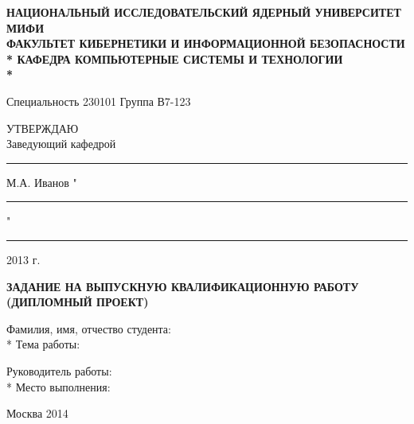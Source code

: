 \begin{titlepage}
\newpage

\begin{center}
\bfseries НАЦИОНАЛЬНЫЙ ИССЛЕДОВАТЕЛЬСКИЙ ЯДЕРНЫЙ УНИВЕРСИТЕТ \guillemotleft МИФИ\guillemotright \\
\vspace{0.7cm}
\bfseries ФАКУЛЬТЕТ КИБЕРНЕТИКИ И ИНФОРМАЦИОННОЙ БЕЗОПАСНОСТИ \\*
КАФЕДРА \guillemotleft КОМПЬЮТЕРНЫЕ СИСТЕМЫ И ТЕХНОЛОГИИ\guillemotright \\*
\end{center}
 
Специальность 230101 \hfill Группа В7-123

\vspace{2em}

\hfill\begin{minipage}[t]{6cm}
\begin{center} 
	\guillemotleft \uppercase{Утверждаю}\guillemotright \\
	Заведующий кафедрой
\end{center}
\begin{flushleft}
\rule{3cm}{0.4pt} М.А. Иванов
"\rule{.5cm}{0.4pt}" \rule{3cm}{0.4pt} 2013 г.
\end{flushleft}
\end{minipage}


\vspace{8em}

\begin{center}
\large\bfseries ЗАДАНИЕ НА ВЫПУСКНУЮ КВАЛИФИКАЦИОННУЮ РАБОТУ \\ (ДИПЛОМНЫЙ ПРОЕКТ)
\end{center}

\vspace{3em}
 
\begin{flushleft}
Фамилия, имя, отчество студента: \textbf{\username} \\*
Тема работы: \begin{minipage}[t]{0.75\textwidth} {\textbf{\thesisTheme}} \end{minipage}
\end{flushleft}
Руководитель работы: \textbf{\projectManager} \\*
Место выполнения: \textbf{\workplace}

\vspace{\fill}

\begin{center}
Москва 2014
\end{center}

\end{titlepage}